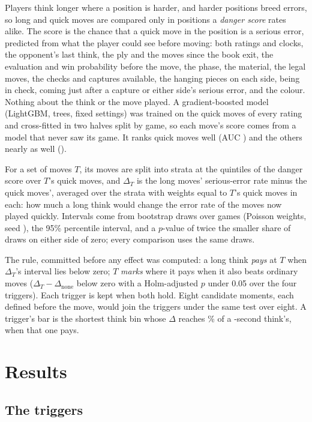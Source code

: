 \documentclass[11pt]{article}
\begin{document}
Players think longer where a position is harder, and harder positions breed errors, so long and
quick moves are compared only in positions a \emph{danger score} rates alike. The score is the
chance that a quick move in the position is a serious error, predicted from what the player could
see before moving: both ratings and clocks, the opponent's last think, the ply and the moves since
the book exit, the evaluation and win probability before the move, the phase, the material, the
legal moves, the checks and captures available, the hanging pieces on each side, being in check,
coming just after a capture or either side's serious error, and the colour. Nothing about the
think or the move played. A gradient-boosted model (LightGBM, \Trees{} trees, fixed settings) was
trained on the quick moves of every rating and cross-fitted in two halves split by game, so each
move's score comes from a model that never saw its game. It ranks quick moves well (AUC \AucQuick)
and the others nearly as well (\AucOther).

For a set of moves $T$, its moves are split into \Strata{} strata at the quintiles of the danger
score over $T$'s quick moves, and $\Delta_T$ is the long moves' serious-error rate minus the quick
moves', averaged over the strata with weights equal to $T$'s quick moves in each: how much a long
think would change the error rate of the moves now played quickly. Intervals come from \Draws{}
bootstrap draws over games (Poisson weights, seed \Seed), the 95\% percentile interval, and a
$p$-value of twice the smaller share of draws on either side of zero; every comparison uses the
same draws.

The rule, committed before any effect was computed: a long think \emph{pays} at $T$ when
$\Delta_T$'s interval lies below zero; $T$ \emph{marks} where it pays when it also beats ordinary
moves ($\Delta_T - \Delta_{\text{none}}$ below zero with a Holm-adjusted $p$ under 0.05 over the
four triggers). Each trigger is kept when both hold. Eight candidate moments, each defined before
the move, would join the triggers under the same test over eight. A trigger's bar is the shortest
think bin whose $\Delta$ reaches \BarShare\% of a \Plateau-second think's, when that one pays.

\section{Results}

\subsection{The triggers}
\end{document}
